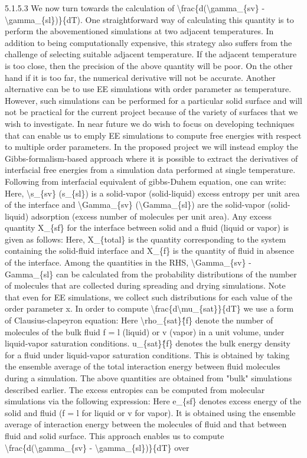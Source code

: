 \par 5.1.5.3 We now turn towards the calculation of \textbackslash frac\{d(\textbackslash gamma\_\{sv\} - \textbackslash gamma\_\{sl\})\}\{dT). One straightforward way of calculating this quantity is to perform the abovementioned simulations at two adjacent temperatures. In addition to being computationally expensive, this strategy also suffers from the challenge of selecting suitable adjacent temperature. If the adjacent temperature is too close, then the precision of the above quantity will be poor. On the other hand if it is too far, the numerical derivative will not be accurate. Another alternative can be to use EE simulations with order parameter as temperature. However, such simulations can be performed for a particular solid surface and will not be practical for the current project because of the variety of surfaces that we wish to investigate. In near future we do wish to focus on developing techniques that can enable us to emply EE simulations to compute free energies with respect to multiple order parameters. In the proposed project we will instead employ the Gibbs-formalism-based approach where it is possible to extract the derivatives of interfacial free energies from a simulation data performed at single temperature. Following from interfacial equivalent of gibbs-Duhem equation, one can write: Here, \textbackslash s\_\{sv\} (s\_\{sl\}) is a solid-vapor (solid-liquid) excess entropy per unit area of the interface and \textbackslash Gamma\_\{sv\} (\textbackslash Gamma\_\{sl\}) are the solid-vapor (solid-liquid) adsorption (excess number of molecules per unit area). Any excess quantity X\_\{sf\} for the interface between solid and a fluid (liquid or vapor) is given as follows: Here, X\_\{total\} is the quantity corresponding to the system containing the solid-fluid interface and X\_\{f\} is the quantity of fluid in absence of the interface. Among the quantities in the RHS, \textbackslash Gamma\_\{sv\} - Gamma\_\{sl\} can be calculated from the probability distributions of the number of molecules that are collected during spreading and drying simulations. Note that even for EE simulations, we collect such distributions for each value of the order parameter x. In order to compute \textbackslash frac\{d\textbackslash mu\_\{sat\}\}\{dT\} we use a form of Clausius-clapeyron equation: Here \textbackslash rho\_\{sat\}\^\{f\} denote the number of molecules of the bulk fluid f = l (liquid) or v (vapor) in a unit volume, under liquid-vapor saturation conditions. u\_\{sat\}\^\{f\} denotes the bulk energy density for a fluid under liquid-vapor saturation conditions. This is obtained by taking the ensemble average of the total interaction energy between fluid molecules during a simulation. The above quantities are obtained from "bulk" simulations described earlier. The excess entropies can be computed from molecular simulations via the following expression: Here e\_\{sf\} denotes excess energy of the solid and fluid (f = l for liquid or v for vapor). It is obtained using the ensemble average of interaction energy between the molecules of fluid and that between fluid and solid surface. This approach enables us to compute \textbackslash frac\{d(\textbackslash gamma\_\{sv\} - \textbackslash gamma\_\{sl\})\}\{dT\} over 